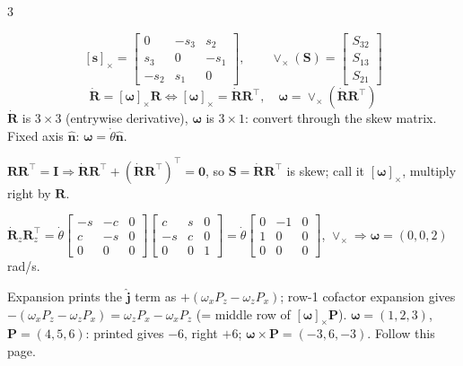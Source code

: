 \begin{multicols}{3}
\begin{fbx}
\[[\mathbf s]_\times=\begin{bmatrix}0&-s_3&s_2\\s_3&0&-s_1\\-s_2&s_1&0\end{bmatrix},\qquad\vee_\times(\mathbf S)=\begin{bmatrix}S_{32}\\S_{13}\\S_{21}\end{bmatrix}\]
\[\dot{\mathbf R}=[\boldsymbol\omega]_\times\mathbf R\iff[\boldsymbol\omega]_\times=\dot{\mathbf R}\mathbf R^\top,\quad\boldsymbol\omega=\vee_\times(\dot{\mathbf R}\mathbf R^\top)\]
$\dot{\mathbf R}$ is $3\times3$ (entrywise derivative), $\boldsymbol\omega$ is $3\times1$: convert through the skew matrix. Fixed axis $\hat{\mathbf n}$: $\boldsymbol\omega=\dot\theta\hat{\mathbf n}$.
\end{fbx}
\begin{deriv}
$\mathbf R\mathbf R^\top=\mathbf I\Rightarrow\dot{\mathbf R}\mathbf R^\top+(\dot{\mathbf R}\mathbf R^\top)^\top=\mathbf 0$, so $\mathbf S=\dot{\mathbf R}\mathbf R^\top$ is skew; call it $[\boldsymbol\omega]_\times$, multiply right by $\mathbf R$.
\end{deriv}
\begin{worked}[$\mathbf R_z(\theta)$, $\theta=30^\circ$, $\dot\theta=2$\,rad/s]
$\dot{\mathbf R}_z\mathbf R_z^\top=\dot\theta\begin{bmatrix}-s&-c&0\\c&-s&0\\0&0&0\end{bmatrix}\begin{bmatrix}c&s&0\\-s&c&0\\0&0&1\end{bmatrix}=\dot\theta\begin{bmatrix}0&-1&0\\1&0&0\\0&0&0\end{bmatrix}$, $\vee_\times\Rightarrow\boldsymbol\omega=(0,0,2)$\,rad/s. \chk
\end{worked}
\begin{slideerr}
Expansion prints the $\hat{\mathbf j}$ term as $+(\omega_xP_z-\omega_zP_x)$; row-1 cofactor expansion gives $-(\omega_xP_z-\omega_zP_x)=\omega_zP_x-\omega_xP_z$ (= middle row of $[\boldsymbol\omega]_\times\mathbf P$). $\boldsymbol\omega=(1,2,3)$, $\mathbf P=(4,5,6)$: printed gives $-6$, right $+6$; $\boldsymbol\omega\times\mathbf P=(-3,6,-3)$. Follow this page. \chk
\end{slideerr}


\end{multicols}
